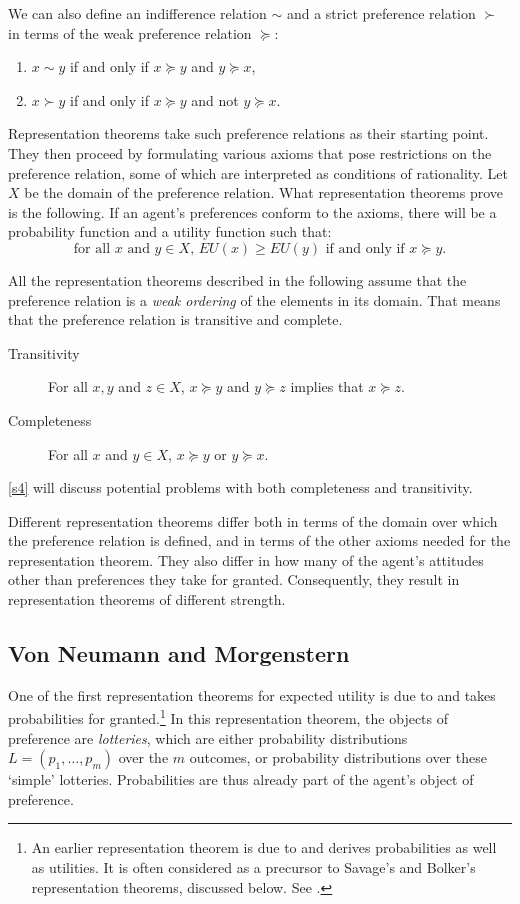 We can also define an indifference relation $\sim$ and a strict preference relation $\succ$ in terms of the weak preference relation $\succcurlyeq$:
\begin{enumerate}
\item $x \sim y$ if and only if $x \succcurlyeq y$ and $y \succcurlyeq x$,
\item $x \succ y$ if and only if $x \succcurlyeq y$ and not $y \succcurlyeq x$.
\end{enumerate}
Representation theorems take such preference relations as their starting point. They then proceed by formulating various axioms that pose restrictions on the preference relation, some of which are interpreted as conditions of rationality. Let $X$ be the domain of the preference relation. What representation theorems prove is the following. If an agent's preferences conform to the axioms, there will be a probability function and a utility function such that:
$$\textrm{for all $x$ and $y \in X$, } EU(x) \geq EU(y) \textrm{ if and only if } x \succcurlyeq y.$$

All the representation theorems described in the following assume that the preference relation is a {\em weak ordering} of the elements in its domain. That means that the preference relation is transitive and complete.
\begin{description}
\item[Transitivity] For all $x, y$ and $z \in X$, $x \succcurlyeq y$ and $y \succcurlyeq z$ implies that $x \succcurlyeq z$.
\item[Completeness] For all $x$ and $y \in X$, $x \succcurlyeq y$ or $y \succcurlyeq x$.
\end{description}
\autoref{s4} will discuss potential problems with both completeness and transitivity.

Different representation theorems differ both in terms of the domain over which the preference relation is defined, and in terms of the other axioms needed for the representation theorem. They also differ in how many of the agent's attitudes other than preferences they take for granted. Consequently, they result in representation theorems of different strength.

\subsection{Von Neumann and Morgenstern}\label{subs22}

One of the first representation theorems for expected utility is due to \citet{vNM1944} and takes probabilities for granted.\footnote{An earlier representation theorem is due to \citet{Ramsey1926} and derives probabilities as well as utilities. It is often considered as a precursor to Savage's and Bolker's representation theorems, discussed below. See \citet{Bradley2004}.} In this representation theorem, the objects of preference are {\em lotteries}, which are either probability distributions $L = (p_1, \ldots, p_m)$ over the $m$ outcomes, or probability distributions over these `simple' lotteries. Probabilities are thus already part of the agent's object of preference.

